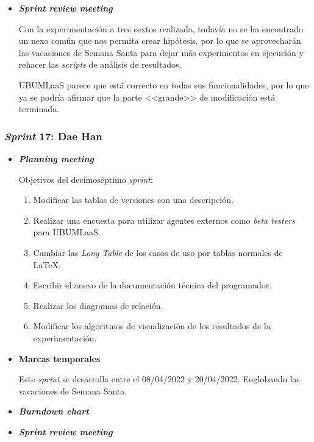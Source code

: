 \begin{itemize}
\item \textbf{\textit{Sprint review meeting}}

Con la experimentación a tres sextos realizada, todavía no se ha encontrado un nexo común que nos permita crear hipótesis, por lo que se aprovecharán las vacaciones de Semana Santa para dejar más experimentos en ejecución y rehacer las \textit{scripts} de análisis de resultados.

UBUMLaaS parece que está correcto en todas sus funcionalidades, por lo que ya se podría afirmar que la parte <<grande>> de modificación está terminada.

\end{itemize}

\subsubsection{\textit{Sprint} 17: Dae Han}
\begin{itemize}
\item \textbf{\textit{Planning meeting}}

Objetivos del decimoséptimo \textit{sprint}:
\begin{enumerate}
\item Modificar las tablas de versiones con una descripción.
\item Realizar una encuesta para utilizar agentes externos como \textit{beta testers} para UBUMLaaS.
\item Cambiar las \textit{Long Table} de los casos de uso por tablas normales de \LaTeX.
\item Escribir el anexo de la documentación técnica del programador.
\item Realizar los diagramas de relación.
\item Modificar los algoritmos de visualización de los resultados de la experimentación.
\end{enumerate}
\item \textbf{Marcas temporales}

Este \textit{sprint} se desarrolla entre el 08/04/2022 y 20/04/2022. Englobando las vacaciones de Semana Santa.

\item \textbf{\textit{Burndown chart}}

\item \textbf{\textit{Sprint review meeting}}

\end{itemize}

\newpage

